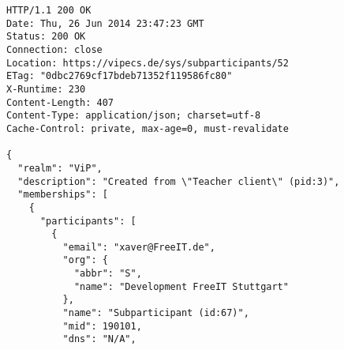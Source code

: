 \documentclass[dvips,12pt,a4paper]{article}
\begin{document}
\begin{verbatim}
HTTP/1.1 200 OK
Date: Thu, 26 Jun 2014 23:47:23 GMT
Status: 200 OK
Connection: close
Location: https://vipecs.de/sys/subparticipants/52
ETag: "0dbc2769cf17bdeb71352f119586fc80"
X-Runtime: 230
Content-Length: 407
Content-Type: application/json; charset=utf-8
Cache-Control: private, max-age=0, must-revalidate

{
  "realm": "ViP",
  "description": "Created from \"Teacher client\" (pid:3)",
  "memberships": [                                                                                                                                                                         
    {                                                                                                                                                                                      
      "participants": [                                                                                                                                                                    
        {                                                                                                                                                                                  
          "email": "xaver@FreeIT.de",                                                                                                                                                      
          "org": {                                                                                                                                                                         
            "abbr": "S",                                                                                                                                                                   
            "name": "Development FreeIT Stuttgart"                                                                                                                                         
          },                                                                                                                                                                               
          "name": "Subparticipant (id:67)",                                                                                                                                                
          "mid": 190101,                                                                                                                                                                   
          "dns": "N/A",                                                                                                                                                                    

\end{verbatim}
\end{document}
